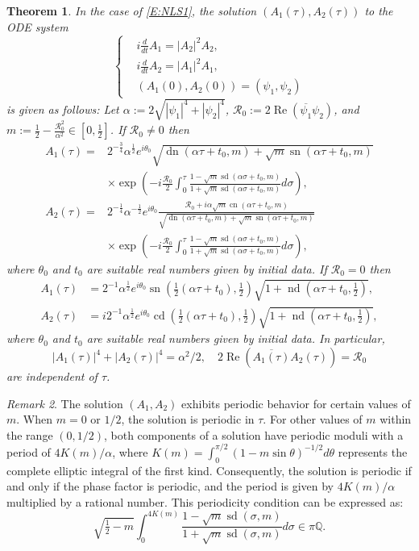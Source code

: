 \documentclass[11pt,a4paper,oneside]{amsart}
\theoremstyle{plain}
\newtheorem{theorem}{Theorem}[section]
\theoremstyle{remark}
\newtheorem{remark}[theorem]{Remark}
\numberwithin{equation}{section}
\newcommand{\Q}{\mathbb{Q}}
\renewcommand{\Re}{\operatorname{Re}}
\def\({\left(}
\def\){\right)}
\DeclareMathOperator{\sn}{sn}
\DeclareMathOperator{\cn}{cn}
\DeclareMathOperator{\dn}{dn}
\DeclareMathOperator{\cd}{cd}
\DeclareMathOperator{\sd}{sd}
\DeclareMathOperator{\nd}{nd}
\theoremstyle{definition}
\begin{document}
\begin{theorem}\label{T:explicit}
In the case of 
\eqref{E:NLS1}, the solution $(A_1(\tau), A_2(\tau))$ to the ODE system
\[
	\left\{
	\begin{aligned}
	&i  \tfrac{d}{dt}A_1  = |A_2|^2 A_2,\\
	&i  \tfrac{d}{dt}A_2  = |A_1|^2 A_1,\\
	&	(A_1(0),A_2(0))= (\psi_1,\psi_2)
	\end{aligned}
	\right.
\]
is given as follows: Let $\alpha := 2 \sqrt{ |\psi_1|^4 + |\psi_2|^4 } $, $\mathcal{R}_0:= 2 \Re (\overline{\psi_1}\psi_2)$, and $m:= \frac12 - \frac{\mathcal{R}_0^2}{\alpha^2} \in [0,\frac12]$. If $\mathcal{R}_0 \neq 0 $ then
\begin{align*}
	A_1(\tau) ={}& 2^{-\frac34} \alpha^\frac12 e^{i\theta_0} \sqrt{    \dn\( \alpha \tau + t_0, m \)+ \sqrt{m} \sn\( \alpha \tau + t_0, m \)} \\
	&\times \exp\( -i \frac{\mathcal{R}_0}2 \int_0^\tau \frac{1- \sqrt{m} \sd\( \alpha \sigma + t_0, m \)}{1+ \sqrt{m} \sd\( \alpha \sigma + t_0, m \)}  d\sigma  \),\\
	A_2(\tau) ={}& 2^{-\frac14} \alpha^{-\frac12} e^{i\theta_0} \frac{\mathcal{R}_0 + i \alpha \sqrt{m} \cn (\alpha \tau + t_0,m)}{\sqrt{    \dn\( \alpha \tau + t_0, m \)+ \sqrt{m} \sn\( \alpha \tau + t_0, m \)}} \\
	&\times \exp\( -i \frac{\mathcal{R}_0}2 \int_0^\tau \frac{1- \sqrt{m} \sd\( \alpha \sigma + t_0, m \)}{1+ \sqrt{m} \sd\( \alpha \sigma + t_0, m \)}  d\sigma  \),
\end{align*}
where $\theta_0$ and $t_0$ are suitable real numbers given by initial data.
If $\mathcal{R}_0=0$ then
\begin{align*}
	A_1(\tau)&=2^{-1} \alpha^{\frac12} e^{i\theta_0}\sn ( \tfrac12 (\alpha\tau + t_0),\tfrac12) \sqrt{1+ \nd (\alpha \tau + t_0,\tfrac12)}, \\
	A_2(\tau)&=i 2^{-1} \alpha^{\frac12} e^{i\theta_0} \cd ( \tfrac12 (\alpha\tau + t_0),\tfrac12) \sqrt{1+ \nd (\alpha \tau+ t_0,\tfrac12)},
\end{align*}
where $\theta_0$ and $t_0$ are suitable real numbers given by initial data.
In particular,
\[
	| A_1(\tau)|^4 + |A_2(\tau)|^4 = \alpha^2/2,\quad
	2 \Re (\overline{A_1(\tau)}A_2(\tau)) = \mathcal{R}_0
\]
are independent of $\tau$.
\end{theorem}

\begin{remark}
The solution $(A_1, A_2)$ exhibits periodic behavior for certain values of $m$. When $m=0$ or $1/2$, the solution is periodic in $\tau$. For other values of $m$ within the range $(0,1/2)$, both components of a solution have periodic moduli with a period of $4K(m)/\alpha$, where $K(m)=\int_0^{\pi/2} (1-m \sin \theta)^{-1/2} d\theta$ represents the complete elliptic integral of the first kind. Consequently, the solution is periodic if and only if the phase factor is periodic, and the period is given by $4K(m)/\alpha$ multiplied by a rational number.
This periodicity condition can be expressed as:
\[
	  \sqrt{\tfrac12-m} \int_0^{4K(m)} \frac{1- \sqrt{m} \sd\(  \sigma , m \)}{1+ \sqrt{m} \sd\(  \sigma , m \)}  d\sigma  \in \pi \Q.
\]
\end{remark}
\end{document}
